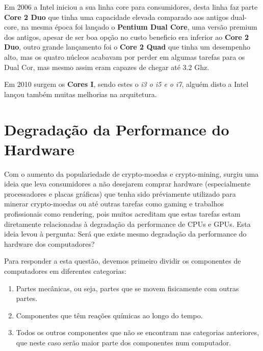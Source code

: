 \documentclass{report}
\begin{document}
Em 2006 a Intel iniciou a sua linha core para consumidores, desta linha faz parte \textbf{Core 2 Duo} que tinha uma capacidade elevada comparado aos antigos dual-core, na mesma época foi lançado o \textbf{Pentium Dual Core}, uma versão premium dos antigos, apesar de ser boa opção no custo beneficio era inferior ao \textbf{Core 2 Duo}, outro grande lançamento foi o \textbf{Core 2 Quad} que tinha um desempenho alto, mas os quatro núcleos acabavam por perder em algumas tarefas para os Dual Cor, mas mesmo assim eram capazes de chegar até 3.2 Ghz.

Em 2010 surgem os \textbf{Cores I}, sendo estes o \textit{i3 o i5 e o i7}, alguém disto a Intel lançou também muitas melhorias na arquitetura. 

\chapter{Degradação da Performance do Hardware}
\label{chap.Degradação}

	Com o aumento da populariedade de crypto-moedas e crypto-mining, surgiu uma ideia que leva consumidores a não desejarem comprar hardware (especialmente processadores e placas gráficas) que tenha sido préviamente utilizado para minerar crypto-moedas ou até outras tarefas como gaming e trabalhos profissionais como rendering, pois muitos acreditam que estas tarefas estam diretamente relacionadas à degradação da performance de \ac{CPU}s e \ac{GPU}s. Esta ideia levou à pergunta: Será que existe mesmo degradação da performance do hardware dos computadores?
	
	Para responder a esta questão, devemos primeiro dividir os componentes de computadores em diferentes categorias:
\renewcommand{\theenumi}{\Roman{enumi}}
\large{\begin{enumerate}
	\item Partes mecânicas, ou seja, partes que se movem fisicamente com outras partes.
	\item Componentes que têm reações químicas ao longo do tempo.
	\item Todos os outros componentes que não se encontram nas categorias anteriores, que neste caso serão maior parte dos componentes num computador.
\end{enumerate}}
\end{document}
